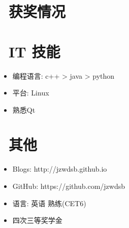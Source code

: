\documentclass{resume}
\begin{document}

\section{\faHeartO\ 获奖情况}


\section{\faCogs\ IT 技能}
\begin{itemize}[parsep=0.5ex]
  \item 编程语言: c++ > java > python
  \item 平台: Linux
  \item 熟悉Qt
\end{itemize}

\section{\faInfo\ 其他}
\begin{itemize}[parsep=0.5ex]
  \item Blogs: http://jzwdsb.github.io
  \item GitHub: https://github.com/jzwdsb
  \item 语言: 英语 熟练(CET6)
  \item 四次三等奖学金
\end{itemize}

%
%
\end{document}
